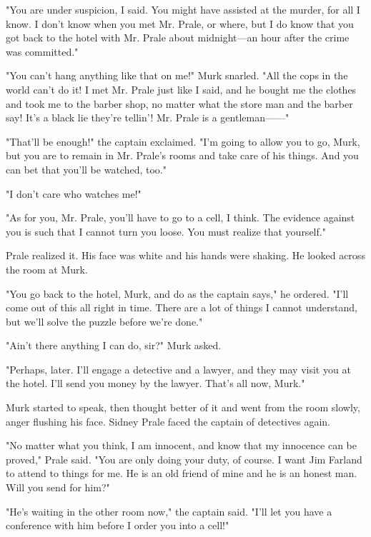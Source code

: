 \documentclass{novel}
\begin{document}
"You are under suspicion, I said. You might have assisted at the murder, for all I know. I don't know when you met Mr. Prale, or where, but I do know that you got back to the hotel with Mr. Prale about midnight---an hour after the crime was committed."

"You can't hang anything like that on me!" Murk snarled. "All the cops in the world can't do it! I met Mr. Prale just like I said, and he bought me the clothes and took me to the barber shop, no matter what the store man and the barber say! It's a black lie they're tellin'! Mr. Prale is a gentleman------"

"That'll be enough!" the captain exclaimed. "I'm going to allow you to go, Murk, but you are to remain in Mr. Prale's rooms and take care of his things. And you can bet that you'll be watched, too."

"I don't care who watches me!"

"As for you, Mr. Prale, you'll have to go to a cell, I think. The evidence against you is such that I cannot turn you loose. You must realize that yourself."

Prale realized it. His face was white and his hands were shaking. He looked across the room at Murk.

"You go back to the hotel, Murk, and do as the captain says," he ordered. "I'll come out of this all right in time. There are a lot of things I cannot understand, but we'll solve the puzzle before we're done."

"Ain't there anything I can do, sir?" Murk asked.

"Perhaps, later. I'll engage a detective and a lawyer, and they may visit you at the hotel. I'll send you money by the lawyer. That's all now, Murk."

Murk started to speak, then thought better of it and went from the room slowly, anger flushing his face. Sidney Prale faced the captain of detectives again.

"No matter what you think, I am innocent, and know that my innocence can be proved," Prale said. "You are only doing your duty, of course. I want Jim Farland to attend to things for me. He is an old friend of mine and he is an honest man. Will you send for him?"

"He's waiting in the other room now," the captain said. "I'll let you have a conference with him before I order you into a cell!"

\vspace{2\nbs}
\clearpage
\thispagestyle{empty}
\end{document}
